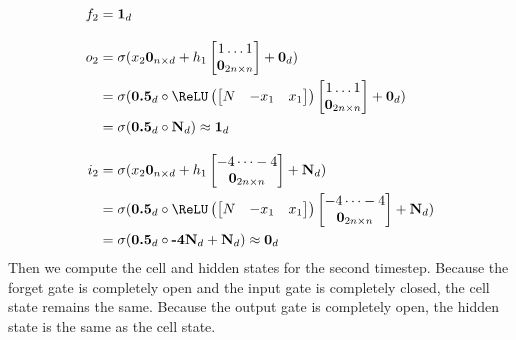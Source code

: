 \begin{align*}
  f_2 &= \textbf{1}_d \\[2ex]
  o_2 &= \sigma(x_2\textbf{0}_{n\times d} + h_{1}\begin{bmatrix} 1 \dots 1 \\ \textbf{0}_{2n\times n} \end{bmatrix}  + \textbf{0}_d) \\
  &= \sigma(\textbf{0.5}_d\circ \ReLU\left( \begin{bmatrix} N & -x_1 & x_1 \end{bmatrix}\right)\begin{bmatrix} 1 \dots 1 \\ \textbf{0}_{2n\times n} \end{bmatrix}  + \textbf{0}_d)  \\
  &=  \sigma(\textbf{0.5}_d\circ \textbf{N}_d) \approx \textbf{1}_d \\[2ex]
  i_2 &= \sigma(x_2\textbf{0}_{n\times d} + h_{1}\begin{bmatrix} -4 \dots -4 \\ \textbf{0}_{2n\times n} \end{bmatrix}  + \textbf{N}_d)  \\
  &= \sigma(\textbf{0.5}_d\circ \ReLU\left( \begin{bmatrix} N & -x_1 & x_1 \end{bmatrix}\right)\begin{bmatrix} -4 \dots -4 \\ \textbf{0}_{2n\times n} \end{bmatrix}  + \textbf{N}_d)   \\
  &=  \sigma(\textbf{0.5}_d\circ\textbf{-4N}_d + \textbf{N}_d) \approx \textbf{0}_d
\end{align*}
%
Then we compute the cell and hidden states for the second timestep. Because the forget gate is completely open and the input gate is completely closed, the cell state remains the same. Because the output gate is completely open, the hidden state is the same as the cell state.
%
